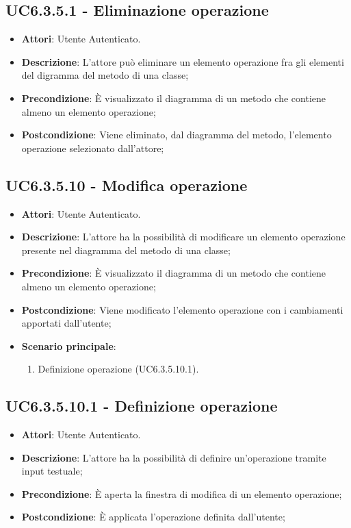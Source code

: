 \subsection{UC6.3.5.1 - Eliminazione operazione} 
\label{ssec:UC6.3.5.1} 
\begin{itemize} 
\item \textbf{Attori}: Utente Autenticato.
\item \textbf{Descrizione}: L'attore può eliminare un elemento operazione fra gli elementi del digramma del metodo di una classe;
\item \textbf{Precondizione}: È visualizzato il diagramma di un metodo che contiene almeno un elemento operazione;
\item \textbf{Postcondizione}: Viene eliminato, dal diagramma del metodo,  l'elemento operazione selezionato dall'attore;
\end{itemize} 
\subsection{UC6.3.5.10 - Modifica operazione} 
\label{ssec:UC6.3.5.10} 
\begin{itemize} 
\item \textbf{Attori}: Utente Autenticato.
\item \textbf{Descrizione}: L'attore ha la possibilità di modificare un elemento operazione presente nel diagramma del metodo di una classe;
\item \textbf{Precondizione}: È visualizzato il diagramma di un metodo che contiene almeno un elemento operazione;
\item \textbf{Postcondizione}: Viene modificato l'elemento operazione con i cambiamenti apportati dall'utente;
\item \textbf{Scenario principale}: \begin{enumerate}\item Definizione operazione (UC6.3.5.10.1). 
 \end{enumerate}
\end{itemize} 
\subsection{UC6.3.5.10.1 - Definizione operazione} 
\label{ssec:UC6.3.5.10.1} 
\begin{itemize} 
\item \textbf{Attori}: Utente Autenticato.
\item \textbf{Descrizione}: L'attore ha la possibilità di definire un'operazione tramite input testuale;
\item \textbf{Precondizione}: È aperta la finestra di modifica di un elemento operazione;
\item \textbf{Postcondizione}: È applicata l'operazione definita dall'utente;
\end{itemize} 
